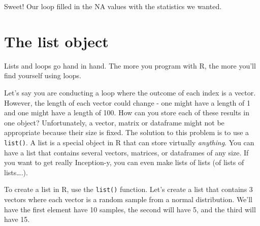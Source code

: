 \documentclass[]{book}
\newenvironment{Shaded}{\begin{snugshade}}{\end{snugshade}}
\newcommand{\KeywordTok}[1]{\textcolor[rgb]{0.13,0.29,0.53}{\textbf{#1}}}
\newcommand{\DataTypeTok}[1]{\textcolor[rgb]{0.13,0.29,0.53}{#1}}
\newcommand{\DecValTok}[1]{\textcolor[rgb]{0.00,0.00,0.81}{#1}}
\newcommand{\StringTok}[1]{\textcolor[rgb]{0.31,0.60,0.02}{#1}}
\newcommand{\CommentTok}[1]{\textcolor[rgb]{0.56,0.35,0.01}{\textit{#1}}}
\newcommand{\NormalTok}[1]{#1}
\theoremstyle{definition}
\theoremstyle{definition}
\theoremstyle{remark}
\begin{document}
Sweet! Our loop filled in the NA values with the statistics we wanted.

\section{The list object}\label{the-list-object}

Lists and loops go hand in hand. The more you program with R, the more
you'll find yourself using loops.

Let's say you are conducting a loop where the outcome of each index is a
vector. However, the length of each vector could change - one might have
a length of 1 and one might have a length of 100. How can you store each
of these results in one object? Unfortunately, a vector, matrix or
dataframe might not be appropriate because their size is fixed. The
solution to this problem is to use a \texttt{list()}. A list is a
special object in R that can store virtually \emph{anything}. You can
have a list that contains several vectors, matrices, or dataframes of
any size. If you want to get really Inception-y, you can even make lists
of lists (of lists of lists\ldots{}.).

To create a list in R, use the \texttt{list()} function. Let's create a
list that contains 3 vectors where each vector is a random sample from a
normal distribution. We'll have the first element have 10 samples, the
second will have 5, and the third will have 15.

\begin{Shaded}
\end{Shaded}
\end{document}
